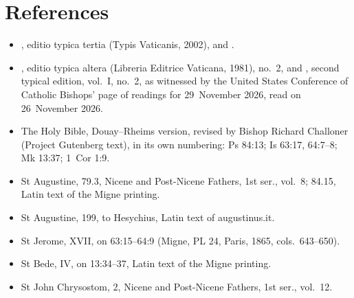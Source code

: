 \section*{References}

{\small
\begin{itemize}\setlength{\itemsep}{0.15em}\setlength{\parskip}{0pt}
\item {}, editio typica tertia (Typis Vaticanis, 2002),  and .
\item {}, editio typica altera (Libreria Editrice Vaticana, 1981), no.~2, and , second typical edition, vol.~I, no.~2, as witnessed by the United States Conference of Catholic Bishops' page of readings for 29~November 2026, read on 26~November 2026.
\item The Holy Bible, Douay--Rheims version, revised by Bishop Richard Challoner (Project Gutenberg text), in its own numbering: Ps 84:13; Is 63:17, 64:7--8; Mk 13:37; 1~Cor 1:9.
\item St Augustine,  79.3, Nicene and Post-Nicene Fathers, 1st ser., vol.~8; 84.15, Latin text of the Migne printing.
\item St Augustine,  199, to Hesychius, Latin text of augustinus.it.
\item St Jerome,  XVII, on 63:15--64:9 (Migne, PL 24, Paris, 1865, cols.~643--650).
\item St Bede,  IV, on 13:34--37, Latin text of the Migne printing.
\item St John Chrysostom,  2, Nicene and Post-Nicene Fathers, 1st ser., vol.~12.
\end{itemize}
\par}
